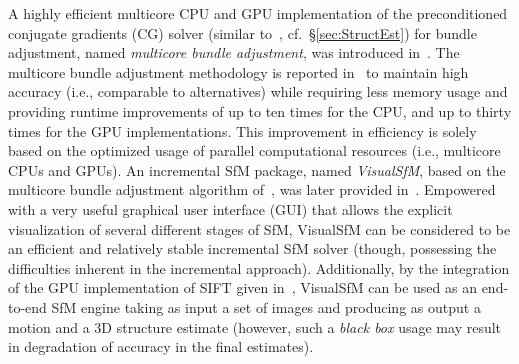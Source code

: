 \documentclass[10pt]{article}
\begin{document}
A highly efficient multicore CPU and GPU implementation of the preconditioned conjugate gradients (CG) solver (similar to~\cite{SnavelyBALarge}, cf.~\S\ref{sec:StructEst}) for bundle adjustment, named \textit{multicore bundle adjustment}, was introduced in~\cite{PBA}. The multicore bundle adjustment methodology is reported in~\cite{PBA} to maintain high accuracy (i.e., comparable to alternatives) while requiring less memory usage and providing runtime improvements of up to ten times for the CPU, and up to thirty times for the GPU implementations. This improvement in efficiency is solely based on the optimized usage of parallel computational resources (i.e., multicore CPUs and GPUs). An incremental SfM package, named \textit{VisualSfM}, based on the multicore bundle adjustment algorithm of~\cite{PBA}, was later provided in~\cite{VisualSfM}. Empowered with a very useful graphical user interface (GUI) that allows the explicit visualization of several different stages of SfM, VisualSfM can be considered to be an efficient and relatively stable incremental SfM solver (though, possessing the difficulties inherent in the incremental approach). Additionally, by the integration of the GPU implementation of SIFT given in~\cite{SiftGPU}, VisualSfM can be used as an end-to-end SfM engine taking as input a set of images and producing as output a motion and a $3$D structure estimate (however, such a \textit{black box} usage may result in degradation of accuracy in the final estimates).
\end{document}
